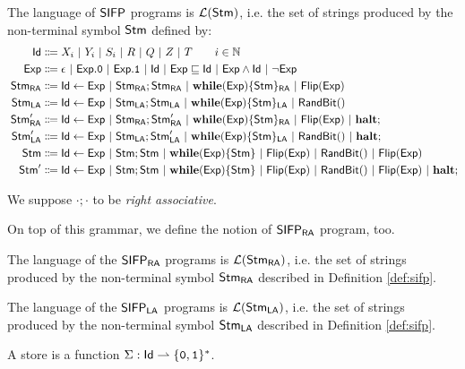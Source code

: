\begin{defn}
  \label{def:sifp}
The language of $\mathsf{SIFP}$ programs is ${\mathcal L ({\mathsf{Stm}})}$, i.e.
the set of strings produced by the non-terminal symbol $\mathsf{Stm}$ defined by:
%
\begin{align*}
\id &\Coloneqq X_i\ |\ Y_i\ |\ S_i\ |\ R\ |\ Q\ |\ Z\ |\ T\qquad i \in \Nat\\
\xp &\Coloneqq \epsilon\ |\ \xp.\zero\ |\ \xp.\one\ |\ \id\ |\ \xp \sqsubseteq \id\ |\ \xp \land \id\ |\ \lnot \xp\\
\stm_\RA & \Coloneqq \id \takes \xp\ |\ \stm_\RA;\stm_\RA\ |\ \while \xp \stm_\RA\ |\ \fl \xp\\\
\stm_\LA & \Coloneqq \id \takes \xp\ |\ \stm_\LA;\stm_\LA\ |\ \while \xp \stm_\LA\ |\ \rb\\
\stm_\RA' & \Coloneqq \id \takes \xp\ |\ \stm_\RA;\stm_\RA'\ |\ \while \xp \stm_\RA\ |\ \fl \xp\ |\ \halt\\
\stm_\LA' & \Coloneqq \id \takes \xp\ |\ \stm_\LA;\stm_\LA'\ |\ \while \xp \stm_\LA\ |\ \rb\ |\ \halt\\
\stm & \Coloneqq \id \takes \xp\ |\ \stm;\stm\ |\ \while \xp \stm\ |\ \fl \xp\ |\ \rb\ |\ \fl\xp\\
\stm' & \Coloneqq \id \takes \xp\ |\ \stm;\stm\ |\ \while \xp \stm\ |\ \fl \xp\ |\ \rb\ |\ \fl\xp\ |\ \halt
\end{align*}
\end{defn}

\begin{notation}
  We suppose $\cdot;\cdot$ to be \emph{right associative}.
\end{notation}

On top of this grammar, we define the notion of $\SIFPRA$ program, too.

\begin{defn}[$\SIFPRA$]
  The language of the $\SIFPRA$ programs is ${\mathcal L ({\mathsf{Stm}_{\mathsf{RA}}})}$, i.e. the set of strings produced by the non-terminal symbol $\mathsf{Stm}_{\mathsf{RA}}$ described in Definition \ref{def:sifp}.
\end{defn}

\begin{defn}[$\SIFPLA$]
  The language of the $\SIFPLA$ programs is ${\mathcal L ({\mathsf{Stm}_{\mathsf{LA}}})}$,
  i.e. the set of strings produced by the non-terminal symbol $\mathsf{Stm}_{\mathsf{LA}}$
  described in Definition \ref{def:sifp}.
\end{defn}

\begin{defn}[Store]
A store is a function $\Sigma: \mathsf{Id} \rightharpoonup \{\mathtt{0}, \mathtt{1}\}^*$.
\end{defn}

